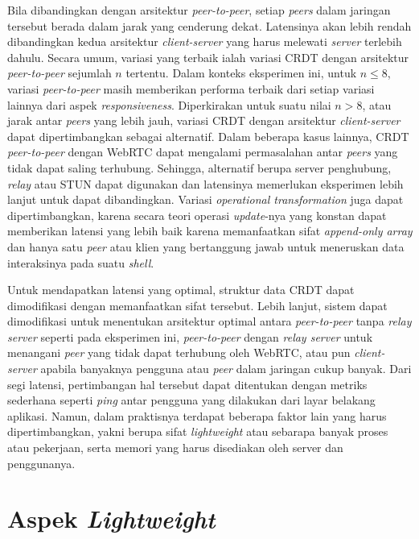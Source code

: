 Bila dibandingkan dengan arsitektur \textit{peer-to-peer}, setiap \textit{peers} dalam jaringan tersebut berada dalam jarak yang cenderung dekat. Latensinya akan lebih rendah dibandingkan kedua arsitektur \textit{client-server} yang harus melewati \textit{server} terlebih dahulu. Secara umum, variasi yang terbaik ialah variasi CRDT dengan arsitektur \textit{peer-to-peer} sejumlah $n$ tertentu. Dalam konteks eksperimen ini, untuk $n \leq 8$, variasi \textit{peer-to-peer} masih memberikan performa terbaik dari setiap variasi lainnya dari aspek \textit{responsiveness}. Diperkirakan untuk suatu nilai $n > 8$, atau jarak antar \textit{peers} yang lebih jauh, variasi CRDT dengan arsitektur \textit{client-server} dapat dipertimbangkan sebagai alternatif. Dalam beberapa kasus lainnya, CRDT \textit{peer-to-peer} dengan WebRTC dapat mengalami permasalahan antar \textit{peers} yang tidak dapat saling terhubung. Sehingga, alternatif berupa server penghubung, \textit{relay} atau STUN dapat digunakan dan latensinya memerlukan eksperimen lebih lanjut untuk dapat dibandingkan. Variasi \textit{operational transformation} juga dapat dipertimbangkan, karena secara teori operasi \textit{update}-nya yang konstan dapat memberikan latensi yang lebih baik karena memanfaatkan sifat \textit{append-only array} dan hanya satu \textit{peer} atau klien yang bertanggung jawab untuk meneruskan data interaksinya pada suatu \textit{shell}.

Untuk mendapatkan latensi yang optimal, struktur data CRDT dapat dimodifikasi dengan memanfaatkan sifat tersebut. Lebih lanjut, sistem dapat dimodifikasi untuk menentukan arsitektur optimal antara \textit{peer-to-peer} tanpa \textit{relay server} seperti pada eksperimen ini, \textit{peer-to-peer} dengan \textit{relay server} untuk menangani \textit{peer} yang tidak dapat terhubung oleh WebRTC, atau pun \textit{client-server} apabila banyaknya pengguna atau \textit{peer} dalam jaringan cukup banyak. Dari segi latensi, pertimbangan hal tersebut dapat ditentukan dengan metriks sederhana seperti \textit{ping} antar pengguna yang dilakukan dari layar belakang aplikasi. Namun, dalam praktisnya terdapat beberapa faktor lain yang harus dipertimbangkan, yakni berupa sifat \textit{lightweight} atau sebarapa banyak proses atau pekerjaan, serta memori yang harus disediakan oleh server dan penggunanya.

\section{Aspek \textit{Lightweight}}

